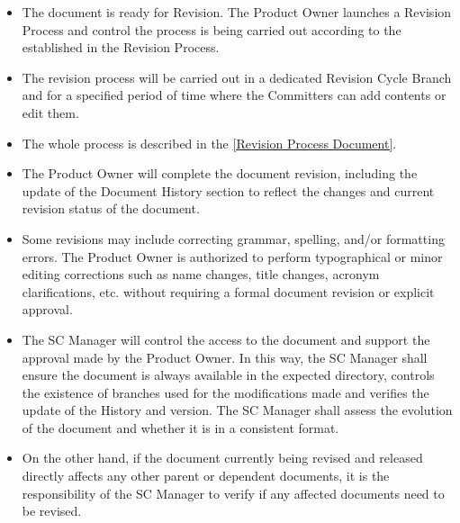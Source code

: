 \documentclass{template/openetcs_article}
\begin{document}
\begin{itemize}
\item The document is ready for Revision. The Product Owner launches a Revision Process and control the process is being carried out according to the established in the Revision Process.
\item The revision process will be carried out in a dedicated Revision Cycle Branch and for a specified period of time where the Committers can add contents or edit them. 
\item The whole process is described in the \href{https://github.com/openETCS/governance/tree/master/Review\%20Process}{[Revision Process Document]}.
\item The Product Owner will complete the document revision, including the update of the Document History section to reflect the changes and current revision status of the document. 
\item Some revisions may include correcting grammar, spelling, and/or formatting errors. The Product Owner is authorized to perform typographical or minor editing corrections such as name changes, title changes, acronym clarifications, etc. without requiring a formal document revision or explicit approval.
\item The SC Manager will control the access to the document and support the approval made by the Product Owner. In this way, the SC Manager shall ensure the document is always available in the expected directory, controls the existence of branches used for the modifications made and verifies the update of the History and version. The SC Manager shall assess the evolution of the document and whether it is in a consistent format.
\item On the other hand, if the document currently being revised and released directly affects any other parent or dependent documents, it is the responsibility of the SC Manager to verify if any affected documents need to be revised.
\end{itemize}
\end{document}
